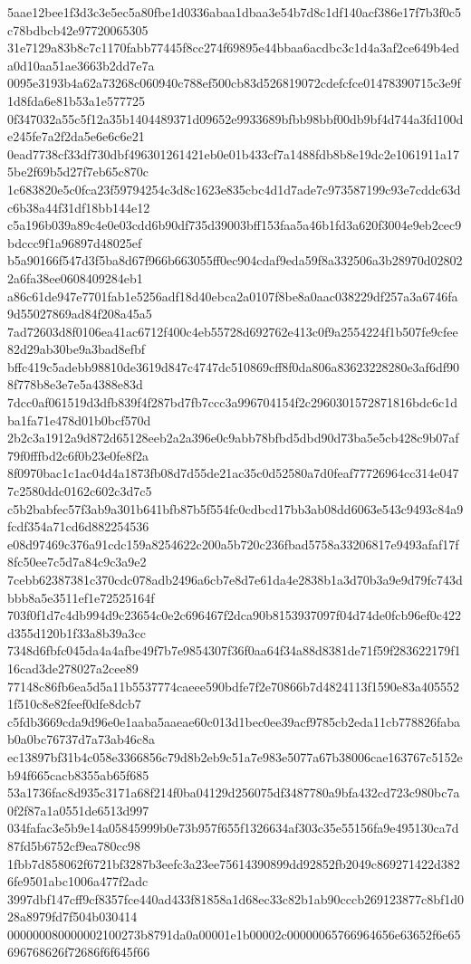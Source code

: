 {5aae12bee1f3d3c3e5ec5a80fbe1d0336abaa1dbaa3e54b7d8c1df140acf386e17f7b3f0c5c78bdbcb42e97720065305
31e7129a83b8c7c1170fabb77445f8cc274f69895e44bbaa6acdbc3c1d4a3af2ce649b4eda0d10aa51ae3663b2dd7e7a
0095e3193b4a62a73268c060940c788ef500cb83d526819072cdefcfce01478390715c3e9f1d8fda6e81b53a1e577725
0f347032a55c5f12a35b1404489371d09652e9933689bfbb98bbf00db9bf4d744a3fd100de245fe7a2f2da5e6e6c6e21
0ead7738cf33df730dbf496301261421eb0e01b433cf7a1488fdb8b8e19dc2e1061911a175be2f69b5d27f7eb65c870c
1c683820e5c0fca23f59794254c3d8c1623e835cbc4d1d7ade7c973587199c93e7cddc63dc6b38a44f31df18bb144e12
c5a196b039a89c4e0e03cdd6b90df735d39003bff153faa5a46b1fd3a620f3004e9eb2cec9bdccc9f1a96897d48025ef
b5a90166f547d3f5ba8d67f966b663055ff0ec904cdaf9eda59f8a332506a3b28970d028022a6fa38ee0608409284eb1
a86c61de947e7701fab1e5256adf18d40ebca2a0107f8be8a0aac038229df257a3a6746fa9d55027869ad84f208a45a5
7ad72603d8f0106ea41ac6712f400c4eb55728d692762e413c0f9a2554224f1b507fe9cfee82d29ab30be9a3bad8efbf
bffc419c5adebb98810de3619d847c4747dc510869cff8f0da806a83623228280e3af6df908f778b8e3e7e5a4388e83d
7dcc0af061519d3dfb839f4f287bd7fb7ccc3a996704154f2c2960301572871816bdc6c1dba1fa71e478d01b0bcf570d
2b2c3a1912a9d872d65128eeb2a2a396e0c9abb78bfbd5dbd90d73ba5e5cb428c9b07af79f0fffbd2c6f0b23e0fe8f2a
8f0970bac1c1ac04d4a1873fb08d7d55de21ac35c0d52580a7d0feaf77726964cc314e0477c2580ddc0162c602c3d7c5
c5b2babfec57f3ab9a301b641bfb87b5f554fc0cdbcd17bb3ab08dd6063e543c9493c84a9fcdf354a71cd6d882254536
e08d97469c376a91cdc159a8254622c200a5b720c236fbad5758a33206817e9493afaf17f8fc50ee7c5d7a84c9c3a9e2
7cebb62387381c370cdc078adb2496a6cb7e8d7e61da4e2838b1a3d70b3a9e9d79fc743dbbb8a5e3511ef1e72525164f
703f0f1d7c4db994d9c23654c0e2c696467f2dca90b8153937097f04d74de0fcb96ef0c422d355d120b1f33a8b39a3cc
7348d6fbfc045da4a4afbe49f7b7e9854307f36f0aa64f34a88d8381de71f59f283622179f116cad3de278027a2cee89
77148c86fb6ea5d5a11b5537774caeee590bdfe7f2e70866b7d4824113f1590e83a4055521f510c8e82feef0dfe8dcb7
c5fdb3669cda9d96e0e1aaba5aaeae60c013d1bec0ee39acf9785cb2eda11cb778826fabab0a0bc76737d7a73ab46c8a
ec13897bf31b4c058e3366856c79d8b2eb9c51a7e983e5077a67b38006cae163767c5152eb94f665cacb8355ab65f685
53a1736fac8d935c3171a68f214f0ba04129d256075df3487780a9bfa432cd723c980bc7a0f2f87a1a0551de6513d997
034fafac3e5b9e14a05845999b0e73b957f655f1326634af303c35e55156fa9e495130ca7d87fd5b6752cf9ea780cc98
1fbb7d858062f6721bf3287b3eefc3a23ee75614390899dd92852fb2049c869271422d3826fe9501abc1006a477f2adc
3997dbf147cff9cf8357fce440ad433f81858a1d68ec33c82b1ab90cccb269123877c8bf1d028a8979fd7f504b030414
000000080000002100273b8791da0a00001e1b00002c00000065766964656e63652f6e65696768626f72686f6f645f66
}
